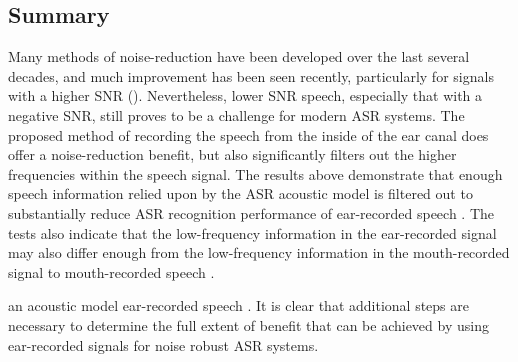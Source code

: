 \subsection{Summary}
\label{chap4:summary}

Many methods of noise-reduction have been developed over the last several decades, and much improvement has been seen recently, particularly for signals with a higher SNR (\cite{zhang:17}).  Nevertheless, lower SNR speech, especially that with a negative SNR, still proves to be a challenge for modern ASR systems.  The proposed method of recording the speech from the inside of the ear canal does offer a noise-reduction benefit, but also significantly filters out the higher frequencies within the speech signal.  The results above demonstrate that enough speech information relied upon by the ASR acoustic model is filtered out to substantially reduce ASR recognition performance of ear-recorded speech \DIFaddbegin {}\DIFaddend .  The tests also indicate that the low-frequency information in the ear-recorded signal may also differ enough from the low-frequency information in the mouth-recorded signal to \DIFdelbegin {}\DIFdelend \DIFaddbegin {}\DIFaddend mouth-recorded speech \DIFdelbegin {}\DIFdelend \DIFaddbegin {}\DIFaddend .  

\DIFdelbegin %

\DIFdelend \DIFaddbegin {}\DIFaddend an acoustic model \DIFdelbegin {}\DIFdelend \DIFaddbegin {}\DIFaddend ear-recorded speech \DIFdelbegin {}\DIFdelend \DIFaddbegin {}\DIFaddend .  It is clear that additional steps are necessary to determine the full extent of benefit that can be achieved by using ear-recorded signals for noise robust ASR systems.
\DIFaddbegin 

